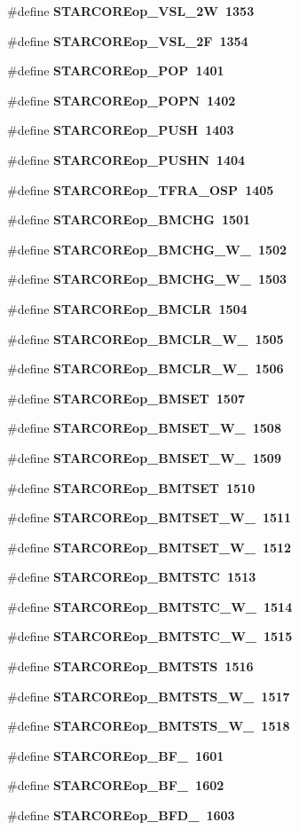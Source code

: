 \begin{CompactItemize}
\item 
\#define \bf{STARCOREop\_\-VSL\_\-2W}~1353
\item 
\#define \bf{STARCOREop\_\-VSL\_\-2F}~1354
\item 
\#define \bf{STARCOREop\_\-POP}~1401
\item 
\#define \bf{STARCOREop\_\-POPN}~1402
\item 
\#define \bf{STARCOREop\_\-PUSH}~1403
\item 
\#define \bf{STARCOREop\_\-PUSHN}~1404
\item 
\#define \bf{STARCOREop\_\-TFRA\_\-OSP}~1405
\item 
\#define \bf{STARCOREop\_\-BMCHG}~1501
\item 
\#define \bf{STARCOREop\_\-BMCHG\_\-W\_}~1502
\item 
\#define \bf{STARCOREop\_\-BMCHG\_\-W\_}~1503
\item 
\#define \bf{STARCOREop\_\-BMCLR}~1504
\item 
\#define \bf{STARCOREop\_\-BMCLR\_\-W\_}~1505
\item 
\#define \bf{STARCOREop\_\-BMCLR\_\-W\_}~1506
\item 
\#define \bf{STARCOREop\_\-BMSET}~1507
\item 
\#define \bf{STARCOREop\_\-BMSET\_\-W\_}~1508
\item 
\#define \bf{STARCOREop\_\-BMSET\_\-W\_}~1509
\item 
\#define \bf{STARCOREop\_\-BMTSET}~1510
\item 
\#define \bf{STARCOREop\_\-BMTSET\_\-W\_}~1511
\item 
\#define \bf{STARCOREop\_\-BMTSET\_\-W\_}~1512
\item 
\#define \bf{STARCOREop\_\-BMTSTC}~1513
\item 
\#define \bf{STARCOREop\_\-BMTSTC\_\-W\_}~1514
\item 
\#define \bf{STARCOREop\_\-BMTSTC\_\-W\_}~1515
\item 
\#define \bf{STARCOREop\_\-BMTSTS}~1516
\item 
\#define \bf{STARCOREop\_\-BMTSTS\_\-W\_}~1517
\item 
\#define \bf{STARCOREop\_\-BMTSTS\_\-W\_}~1518
\item 
\#define \bf{STARCOREop\_\-BF\_}~1601
\item 
\#define \bf{STARCOREop\_\-BF\_}~1602
\item 
\#define \bf{STARCOREop\_\-BFD\_}~1603
\item 

\end{CompactItemize}
